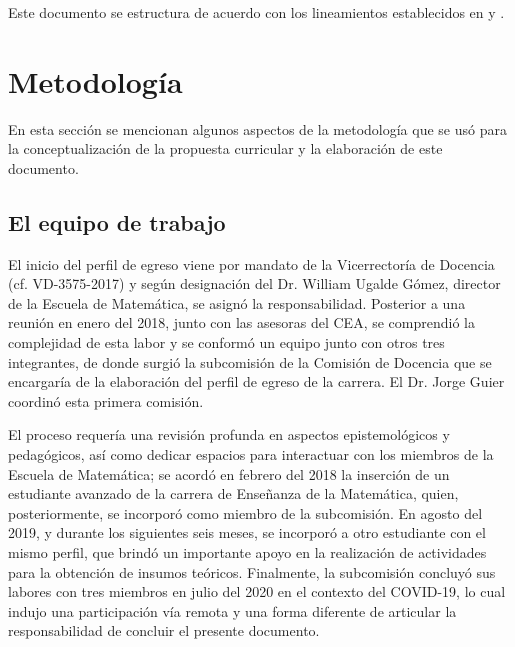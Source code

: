 Este documento se estructura de acuerdo con los lineamientos establecidos en \cite{Bolanos15} y \cite{CEA24}. 

\section{Metodología}

En esta sección se mencionan algunos aspectos de la metodología que se usó para la conceptualización de la propuesta curricular y la elaboración de este documento.


\subsection{El equipo de trabajo}

El inicio del perfil de egreso viene por mandato de la Vicerrectoría de Docencia (cf. VD-3575-2017) y según designación del Dr. William Ugalde Gómez, director de la Escuela de Matemática, se asignó la responsabilidad. Posterior a una reunión en enero del 2018, junto con las asesoras del CEA, se comprendió la complejidad de esta labor y se conformó un equipo junto con otros tres integrantes, de donde surgió la subcomisión de la Comisión de Docencia que se encargaría de la elaboración del perfil de egreso de la carrera. El Dr. Jorge Guier coordinó esta primera comisión.

El proceso requería una revisión profunda en aspectos epistemológicos y pedagógicos, así como dedicar espacios para interactuar con los miembros de la Escuela de Matemática; se acordó en febrero del 2018 la inserción de un estudiante avanzado de la carrera de Enseñanza de la Matemática, quien, posteriormente, se incorporó como miembro de la subcomisión. En agosto del 2019, y durante los siguientes seis meses, se incorporó a otro estudiante con el mismo perfil, que brindó un importante apoyo en la realización de actividades para la obtención de insumos teóricos. Finalmente, la subcomisión concluyó sus labores con tres miembros en julio del 2020 en el contexto del COVID-19, lo cual indujo una participación vía remota y una forma diferente de articular la responsabilidad de concluir el presente documento. 


